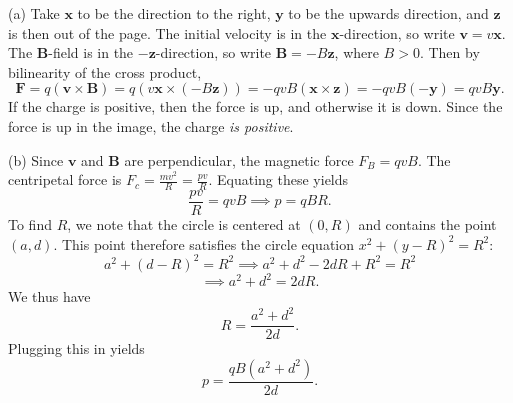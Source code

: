 \documentclass[11pt, letterpaper]{article}
\begin{document}
(a) Take $\mathbf{x} $ to be the direction to the right, $\mathbf{y} $ to be the upwards direction, and $\mathbf{z} $ is then out of the page. The initial velocity is in the $\mathbf{x} $-direction, so write $\mathbf{v} =v\mathbf{x} $. The $\mathbf{B} $-field is in the $-\mathbf{z} $-direction, so write $\mathbf{B} =-B\mathbf{z} $, where $B>0$. Then by bilinearity of the cross product,
\[
	\mathbf{F} =q(\mathbf{v} \times \mathbf{B} )=q(v \mathbf{x} \times (-B \mathbf{z} ))=-qvB(\mathbf{x} \times \mathbf{z} )=-qvB(-\mathbf{y} )=qvB \mathbf{y} 
.\]
If the charge is positive, then the force is up, and otherwise it is down. Since the force is up in the image, the charge \emph{is positive}.

(b) Since $\mathbf{v} $ and $\mathbf{B} $ are perpendicular, the magnetic force $F_B=qvB$. The centripetal force is $F_c=\frac{mv^2}{R} =\frac{pv}{R} $. Equating these yields
\[
	\frac{pv}{R} =qvB \implies p=qBR
.\]
To find $R$, we note that the circle is centered at $(0,R)$ and contains the point $(a,d)$. This point therefore satisfies the circle equation $x^2+(y-R)^2=R^2$:
\[
	a^2+(d-R)^2=R^2 \implies a^2 + d^2-2dR + R^2 = R^2
\]
\[
	\implies a^2+d^2=2dR
.\]
We thus have
\[
	R=\frac{a^2+d^2}{2d} 
.\]
Plugging this in yields
\[
	p=\boxed{\frac{qB\left( a^2+d^2 \right) }{2d} }
.\]
\end{document}
